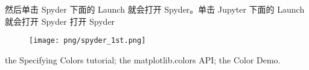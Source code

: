 \documentclass[main.tex]{subfiles}
\begin{document}
	然后单击 Spyder 下面的 Launch 就会打开 Spyder。单击 Jupyter 下面的 Launch 就会打开 Spyder
打开 Spyder
\begin{figure}[t]
	\texttt{[image: png/spyder\_1st.png]}
\end{figure}

the Specifying Colors tutorial;
the matplotlib.colors API;
the Color Demo.
\end{document}
